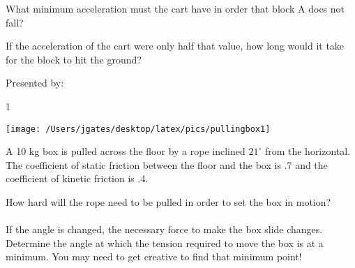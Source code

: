 \bigskip
What minimum acceleration must the cart have in order that block A does not fall? 

\vfill
If the acceleration of the cart were only half that value, how long would it take for the block to hit the ground?

\vfill
\vfill
\newpage


\AddToShipoutPicture*{\BackgroundPic}


\bigskip
{\large Presented by: }\underline{\hspace{5cm}}




\vfill
\newpage


\AddToShipoutPicture*{\BackgroundPic}

\addtocounter {ProbNum} {1}

\begin{floatingfigure}[r]{.35\textwidth}
\texttt{[image: /Users/jgates/desktop/latex/pics/pullingbox1]}
\end{floatingfigure}
 
{\bf \Large{}} A 10 kg box is pulled across the floor by a rope inclined ${21^{\circ}}$ from the horizontal. The coefficient of static friction between the floor and the box is .7 and the coefficient of kinetic friction is .4. 

\bigskip
How hard will the rope need to be pulled in order to set the box in motion?
\paragraph{}
\noindent
\vfill

If the angle is changed, the necessary force to make the box slide changes. Determine the angle at which the tension required to move the box is at a minimum.  You may need to get creative to find that minimum point!
\vfill

\newpage

\AddToShipoutPicture*{\BackgroundPic}


